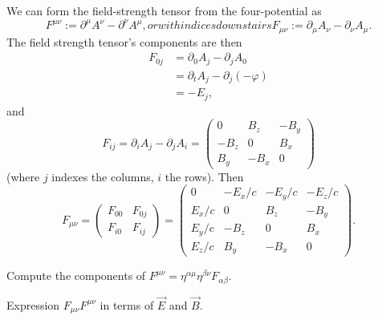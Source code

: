 We can form the field-strength tensor from the four-potential as
\begin{subequations}
\begin{equation}
F^{\mu\nu} := \partial^{\mu}A^{\nu} - \partial^{\nu}A^{\mu},
\end{equation}
or with indices downstairs
\begin{equation}
F_{\mu\nu} := \partial_{\mu}A_{\nu} - \partial_{\nu}A_{\mu}.
\end{equation}
\end{subequations}
The field strength tensor's components are then
\begin{subequations}
\begin{align}
F_{0j} &= \partial_{0}A_{j} - \partial_{j}A_{0}\\
&= \partial_{t}A_{j} - \partial_{j}(-\varphi)\\
&= -E_{j},
\end{align}
\end{subequations}
and
\begin{equation}
F_{ij} = \partial_{i}A_{j} - \partial_{j}A_{i} = \begin{pmatrix}
 0     &  B_{z} & -B_{y}\\
-B_{z} &  0     & B_{x}\\
 B_{y} & -B_{x} & 0
\end{pmatrix}
\end{equation}
(where $j$ indexes the columns, $i$ the rows). Then
\begin{equation}
F_{\mu\nu} = \begin{pmatrix}F_{00} & F_{0j}\\
F_{i0} & F_{ij}
\end{pmatrix} = \begin{pmatrix}
 0       & -E_{x}/c & -E_{y}/c & -E_{z}/c\\
 E_{x}/c &  0       &  B_{z}   & -B_{y}\\
 E_{y}/c & -B_{z}   &  0       &  B_{x}\\
 E_{z}/c &  B_{y}   & -B_{x}   &  0
\end{pmatrix}.
\end{equation}

\begin{exercise}
Compute the components of $F^{\mu\nu}=\eta^{\alpha\mu}\eta^{\beta\nu}F_{\alpha\beta}$.
\end{exercise}

\begin{exercise}
Expression $F_{\mu\nu}F^{\mu\nu}$ in terms of $\vec{E}$ and $\vec{B}$.
\end{exercise}


